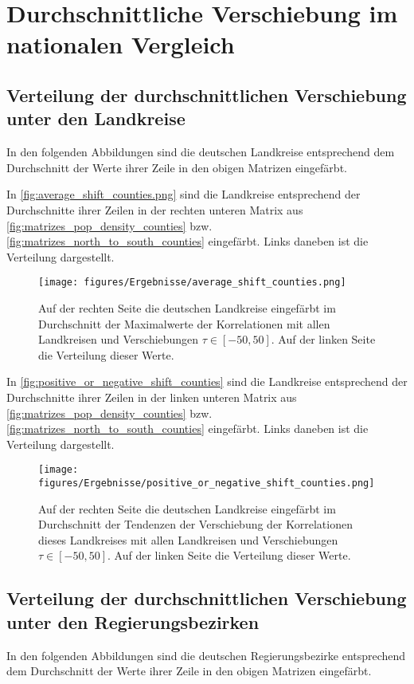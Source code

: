 \section{Durchschnittliche Verschiebung im nationalen Vergleich}
\subsection{Verteilung der durchschnittlichen Verschiebung unter den Landkreise}
In den folgenden Abbildungen sind die deutschen Landkreise entsprechend dem Durchschnitt der Werte ihrer Zeile in den obigen Matrizen eingefärbt.


In \autoref{fig:average_shift_counties.png} sind die Landkreise entsprechend der Durchschnitte ihrer Zeilen in der rechten unteren Matrix aus \autoref{fig:matrizes_pop_density_counties} bzw. \autoref{fig:matrizes_north_to_south_counties} eingefärbt. Links daneben ist die Verteilung dargestellt.

\begin{figure}[H]
    \centering
    \texttt{[image: figures/Ergebnisse/average\_shift\_counties.png]}
    \caption{Auf der rechten Seite die deutschen Landkreise eingefärbt im Durchschnitt der Maximalwerte der Korrelationen mit allen Landkreisen und Verschiebungen $\tau\in[-50,50]$. Auf der linken Seite die Verteilung dieser Werte.}
    \label{fig:average_shift_counties.png}
\end{figure}

In \autoref{fig:positive_or_negative_shift_counties} sind die Landkreise entsprechend der Durchschnitte ihrer Zeilen in der linken unteren Matrix aus \autoref{fig:matrizes_pop_density_counties} bzw. \autoref{fig:matrizes_north_to_south_counties} eingefärbt. Links daneben ist die Verteilung dargestellt.

\begin{figure}[H]
    \centering
    \texttt{[image: figures/Ergebnisse/positive\_or\_negative\_shift\_counties.png]}
    \caption{Auf der rechten Seite die deutschen Landkreise eingefärbt im Durchschnitt der Tendenzen der Verschiebung der Korrelationen dieses Landkreises mit allen Landkreisen und Verschiebungen $\tau\in[-50,50]$. Auf der linken Seite die Verteilung dieser Werte.}
    \label{fig:positive_or_negative_shift_counties}
\end{figure}



\subsection{Verteilung der durchschnittlichen Verschiebung unter den Regierungsbezirken}
In den folgenden Abbildungen sind die deutschen Regierungsbezirke entsprechend dem Durchschnitt der Werte ihrer Zeile in den obigen Matrizen eingefärbt.

